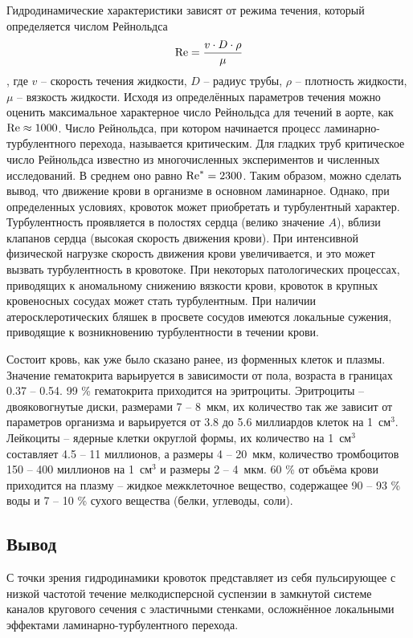 Гидродинамические характеристики зависят от режима течения, который определяется числом Рейнольдса
$$\mathrm{Re}=\frac{v\cdot D\cdot \rho}{\mu}$$,
где $v$ -- скорость течения жидкости, $D$ -- радиус трубы, $\rho$ -- плотность жидкости, $\mu$ -- вязкость жидкости.
Исходя из определённых параметров течения можно оценить максимальное характерное число Рейнольдса для течений в аорте, как
$\mathrm{Re}\approx 1000 $. Число Рейнольдса, при котором начинается процесс ламинарно-турбулентного перехода, называется критическим.  
Для гладких труб критическое число Рейнольдса известно из многочисленных экспериментов и численных исследований. В среднем оно равно $\mathrm{Re}^*=2300$.
Таким образом, можно сделать вывод, что движение крови в организме в основном ламинарное. 
Однако, при определенных условиях, кровоток может приобретать и турбулентный характер.
Турбулентность проявляется в полостях сердца (велико значение $A$), вблизи клапанов сердца (высокая скорость движения крови). 
При интенсивной физической нагрузке скорость движения крови увеличивается, и это может вызвать турбулентность в кровотоке. 
При некоторых патологических процессах, приводящих к аномальному снижению вязкости крови, кровоток в крупных кровеносных сосудах может 
стать турбулентным.  При наличии атеросклеротических бляшек в просвете сосудов имеются локальные сужения, приводящие к возникновению 
турбулентности в течении крови. 


Состоит кровь, как уже было сказано ранее, из форменных клеток и плазмы. Значение гематокрита варьируется в зависимости от пола,
возраста в границах 0.37 -- 0.54. 99 \% гематокрита 
приходится на эритроциты. Эритроциты -- двояковогнутые диски, размерами 7 -- 8~мкм, их количество так же зависит
от параметров организма 
и варьируется от 3.8 до 5.6 миллиардов клеток на 1~см$^3$. 
Лейкоциты -- ядерные клетки округлой формы, их количество на 1~см$^3$ составляет 4.5 -- 11 миллионов, а размеры 4 -- 20~мкм, 
количество тромбоцитов 150 -- 400 миллионов на 1~см$^3$ и размеры 2 -- 4~мкм. 60 \% от объёма крови приходится на плазму -- жидкое межклеточное 
вещество, содержащее 90 -- 93 \% воды и 7 -- 10 \% сухого вещества (белки, углеводы, соли).

\subsection{Вывод}
 С точки зрения гидродинамики кровоток представляет из себя пульсирующее с низкой частотой течение мелкодисперсной суспензии в 
 замкнутой системе каналов кругового сечения с эластичными стенками, осложнённое локальными эффектами ламинарно-турбулентного перехода.
